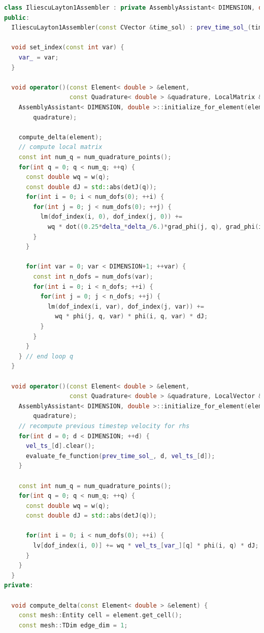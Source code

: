 \documentclass[a4paper, 11pt, twoside]{article}
\begin{document}
\begin{lstlisting}[language=C++, basicstyle={\footnotesize, \ttfamily}, keywordstyle=\color{blue},  numbers=none, tabsize=2]
class IliescuLayton1Assembler : private AssemblyAssistant< DIMENSION, double > {
public:
  IliescuLayton1Assembler(const CVector &time_sol) : prev_time_sol_(time_sol) {}

  void set_index(const int var) {
    var_ = var;
  }

  void operator()(const Element< double > &element,
                  const Quadrature< double > &quadrature, LocalMatrix &lm) {
    AssemblyAssistant< DIMENSION, double >::initialize_for_element(element,
        quadrature);

    compute_delta(element);
    // compute local matrix
    const int num_q = num_quadrature_points();
    for(int q = 0; q < num_q; ++q) {
      const double wq = w(q);
      const double dJ = std::abs(detJ(q));
      for(int i = 0; i < num_dofs(0); ++i) {
        for(int j = 0; j < num_dofs(0); ++j) {
          lm(dof_index(i, 0), dof_index(j, 0)) +=
            wq * dot((0.25*delta_*delta_/6.)*grad_phi(j, q), grad_phi(i, q)) * dJ;
        }
      }

      for(int var = 0; var < DIMENSION+1; ++var) {
        const int n_dofs = num_dofs(var);
        for(int i = 0; i < n_dofs; ++i) {
          for(int j = 0; j < n_dofs; ++j) {
            lm(dof_index(i, var), dof_index(j, var)) +=
              wq * phi(j, q, var) * phi(i, q, var) * dJ;
          }
        }
      }
    } // end loop q
  }

  void operator()(const Element< double > &element,
                  const Quadrature< double > &quadrature, LocalVector &lv) {
    AssemblyAssistant< DIMENSION, double >::initialize_for_element(element,
        quadrature);
    // recompute previous timestep velocity for rhs
    for(int d = 0; d < DIMENSION; ++d) {
      vel_ts_[d].clear();
      evaluate_fe_function(prev_time_sol_, d, vel_ts_[d]);
    }

    const int num_q = num_quadrature_points();
    for(int q = 0; q < num_q; ++q) {
      const double wq = w(q);
      const double dJ = std::abs(detJ(q));

      for(int i = 0; i < num_dofs(0); ++i) {
        lv[dof_index(i, 0)] += wq * vel_ts_[var_][q] * phi(i, q) * dJ;
      }
    }
  }
private:

  void compute_delta(const Element< double > &element) {
    const mesh::Entity cell = element.get_cell();
    const mesh::TDim edge_dim = 1;


\end{lstlisting}
\end{document}
